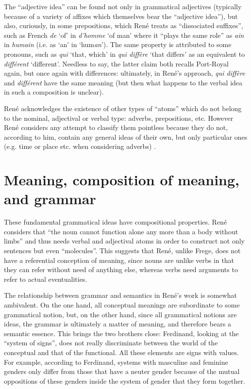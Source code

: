 \documentclass[output=paper]{langsci/langscibook}
\begin{document}
\pagebreak The ``adjective idea'' can be found not only in grammatical adjectives
(typically because of a variety of affixes which themselves bear the
``adjective idea''), but also, curiously, in some prepositions, which
René treats as ``dissociated suffixes'', such as French \emph{de} ‘of’ in
\emph{d’homme} ‘of man’ where it ``plays the same role'' as \emph{ain}
in \emph{humain} (i.e. as ‘an’ in ‘hum\emph{an}’). The same property
is attributed to some pronouns, such as \emph{qui} ‘that, which' in
\emph{qui diffère} ‘that differs’ as an equivalent to \emph{différent}
‘different’. Needless to say, the latter claim both recalls Port-Royal
again, but once again with differences: ultimately, in René’s approach,
\emph{qui diffère} and \emph{différent} have the same meaning (but
then what happens to the verbal idea in such a composition is
unclear).

René acknowledges the existence of other types of ``atoms'' which do not
belong to the nominal, adjectival or verbal type: adverbs,
prepositions, etc. However René considers any attempt to classify them
pointless because they do not, according to him, contain any general
ideas of their own, but only particular ones (e.g. time or place
etc. when considering adverbs)
\citep[117]{r.desaussure11:formation}.

\section{Meaning, composition of meaning, and grammar}
\label{sec:meaning-grammar}

These fundamental grammatical ideas have compositional properties. René
considers that “the noun cannot function alone any more than a body
without limbs'' \citep[75]{r.desaussure11:formation} and thus needs
verbal and adjectival atoms in order to construct not only sentences
but even ``molecules''. This suggests that René, unlike Frege, does not
have a referential conception of meaning, since nouns are unlike verbs
in that they can refer without need of anything else, whereas verbs
need arguments to refer to actual eventualities.\largerpage[1.5]

The relationship between grammar and semantics in René’s work is
somewhat ambivalent. On the one hand, all conceptual meanings are
subordinate to some grammatical notion, but, on the other hand, since all
grammatical notions are ideas, the grammar is ultimately a matter of
meaning, and therefore bears a semantic essence. This brings the two
brothers close: Ferdinand, looking at the ``system of signs'', does not
really discriminate between the world of the conceptual and that of
the functional. All these elements are signs with values. For example,
according to Ferdinand, systems with masculine and feminine genders
only differ from those that have a neuter gender because of the mutual
oppositions of these genders inside the system of gender that they
form together.  
 
\end{document}
